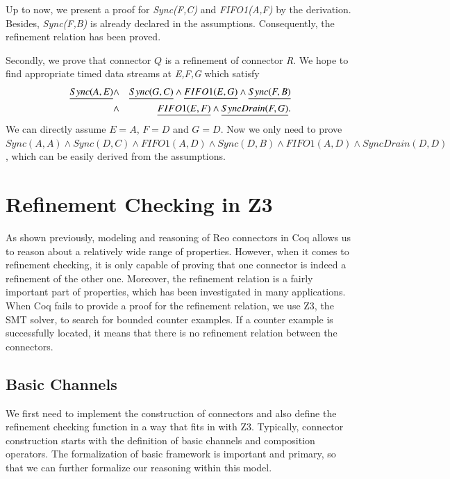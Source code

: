 \documentclass[preprint,3p]{elsarticle}
\begin{document}
Up to now, we present a proof for \emph{Sync(F,C)} and \emph{FIFO1(A,F)} by the derivation. Besides, \emph{Sync(F,B)} is already declared in the assumptions. Consequently, the refinement relation has been proved.

Secondly, we prove that connector $Q$ is a refinement of connector \emph{R}.
We hope to find appropriate timed data streams at \emph{E,F,G}  which satisfy
\begin{eqnarray*}
\emph{Sync(A,E)}&\wedge& \emph{Sync(G,C)} \wedge \emph{FIFO1(E,G)}\wedge \emph{Sync(F,B)}\\
 &\wedge& \emph{FIFO1(E,F)}\wedge \emph{SyncDrain(F,G)}.
\end{eqnarray*}
We can directly assume $E=A$, $F=D$ and $G=D$. Now we only need to prove
$Sync(A,A) \wedge  Sync(D,C)  \wedge  FIFO1(A,D) \wedge  Sync(D,B) \wedge FIFO1(A,D) \wedge SyncDrain(D,D)$, which can be easily derived from the assumptions.


\section{Refinement Checking in Z3} \label{sec:refinement}
As shown previously, modeling and reasoning of Reo connectors in Coq allows us to reason about a relatively wide range of properties. However, when it comes to refinement checking, it is only capable of proving that one connector is indeed a refinement of the other one. Moreover, the refinement relation is a fairly important part of properties, which has been investigated in many applications. When Coq fails to provide a proof for the refinement relation, we use Z3, the SMT solver, to search for bounded counter examples. If a counter example is successfully located, it means that there is no refinement relation between the connectors.

\subsection{Basic Channels}
\label{subsec:basicchannelsinZ3}

We first need to implement the construction of connectors and also define the refinement checking function in a way that fits in with Z3. Typically, connector construction starts with the definition of basic channels and composition operators. The formalization of basic framework is important and primary, so that we can further formalize our reasoning within this model.
\end{document}

